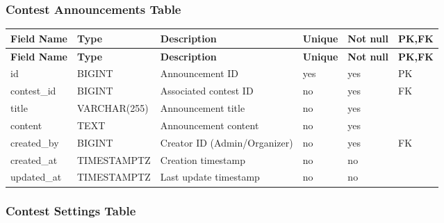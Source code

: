 \vspace{1em}
\subsubsection{Contest Announcements Table}
\label{subsubsec:contest-announcements-table}

\vspace{0.5em}
\renewcommand{\arraystretch}{1.15}
\setlength{\tabcolsep}{4pt}
\small
\begin{longtable}{|>{\raggedright\arraybackslash}p{}|>{\raggedright\arraybackslash}p{}|>{\raggedright\arraybackslash}p{}|>{\centering\arraybackslash}p{}|>{\centering\arraybackslash}p{}|>{\centering\arraybackslash}p{}|}
\hline
\textbf{Field Name} & \textbf{Type} & \textbf{Description} & \textbf{Unique} & \textbf{Not null} & \textbf{PK,FK} \\
\hline
\endfirsthead
\textbf{Field Name} & \textbf{Type} & \textbf{Description} & \textbf{Unique} & \textbf{Not null} & \textbf{PK,FK} \\
\hline
\endhead
id & BIGINT & Announcement ID & yes & yes & PK \\
\hline
contest\_id & BIGINT & Associated contest ID & no & yes & FK \\
\hline
title & VARCHAR(255) & Announcement title & no & yes & \\
\hline
content & TEXT & Announcement content & no & yes & \\
\hline
created\_by & BIGINT & Creator ID (Admin/Organizer) & no & yes & FK \\
\hline
created\_at & TIMESTAMPTZ & Creation timestamp & no & no & \\
\hline
updated\_at & TIMESTAMPTZ & Last update timestamp & no & no & \\
\hline
\end{longtable}

\vspace{1em}
\subsubsection{Contest Settings Table}
\label{subsubsec:contest-settings-table}


